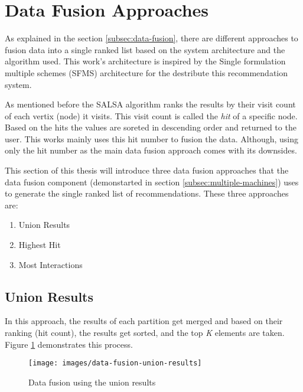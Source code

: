 \section{Data Fusion Approaches}
\label{sec:data-fusion-approaches}
As explained in the section \ref{subsec:data-fusion}, there are different approaches to fusion data into a single ranked list based on the system architecture and the algorithm used. This work's architecture is inspired by the Single formulation multiple schemes (SFMS) architecture for the destribute this recommendation system. 


As mentioned before the SALSA algorithm ranks the results by their visit count of each vertix (node) it visits. This visit count is called the \emph{hit} of a specific node. Based on the hits the values are soreted in descending order and returned to the user. This works mainly uses this hit number to fusion the data. Although, using only the hit number as the main data fusion approach comes with its downsides.


This section of this thesis will introduce three data fusion approaches that the data fusion component (demonstarted in section \ref{subsec:multiple-machines}) uses to generate the single ranked list of recommendations. These three approaches are:

\begin{enumerate}
	\item Union Results
	\item Highest Hit
	\item Most Interactions
\end{enumerate}

\subsection{Union Results}
\label{subsec:data-fusion-union-results}
In this approach, the results of each partition get merged and based on their ranking (hit count), the results get sorted, and the top \emph{K} elements are taken. Figure \ref{fig:data-fusion-union-results} demonstrates this process.


\begin{figure}[!hb]
	\centering
	\texttt{[image: images/data-fusion-union-results]}
	\caption{Data fusion using the union results}
	\label{fig:data-fusion-union-results}
\end{figure}

